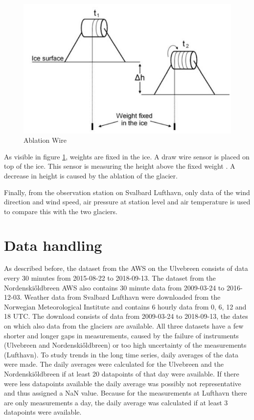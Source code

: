 \documentclass[11pt]{report}
\begin{document}
\begin{figure}[h]
\raggedright
\begin{minipage}{0.65\textwidth}
\raggedright
    \includegraphics[scale=1, width=1\textwidth]{abliationwire.jpg}	 
    \caption{Ablation Wire \cite{abl}}
    \label{fig:ablation}
\end{minipage}%
\end{figure}

As visible in figure \ref{fig:ablation}, weights are fixed in the ice. A draw wire sensor is placed on top of the ice. This sensor is measuring the height above the fixed weight \cite{abl}. A decrease in height is caused by the ablation of the glacier.

Finally, from the observation station on Svalbard Lufthavn, only data of the wind direction and wind speed, air pressure at station level and air temperature is used to compare this with the two glaciers.

\section{Data handling}\label{sec:datah}

As described before, the dataset from the AWS on the Ulvebreen consists of data every 30 minutes from 2015-08-22 to 2018-09-13. The dataset from the Nordenski\H{o}ldbreen AWS also contains 30 minute data from 2009-03-24 to 2016-12-03. Weather data from Svalbard Lufthavn were downloaded from the Norwegian Meteorological Institute \cite{sharkii} and contains 6 hourly data from 0, 6, 12 and 18 UTC. The download consists of data from 2009-03-24 to 2018-09-13, the dates on which also data from the glaciers are available. All three datasets have a few shorter and longer gaps in measurements, caused by the failure of instruments (Ulvebreen and Nordenski\H{o}ldbreen) or too high uncertainty of the measurements (Lufthavn). To study trends in the long time series, daily averages of the data were made. The daily averages were calculated for the Ulvebreen and the Nordenski\H{o}ldbreen if at least 20 datapoints of that day were available. If there were less datapoints available the daily average was possibly not representative and thus assigned a NaN value. Because for the measurements at Lufthavn there are only measurements a day, the daily average was calculated if at least 3 datapoints were available. 
\end{document}
